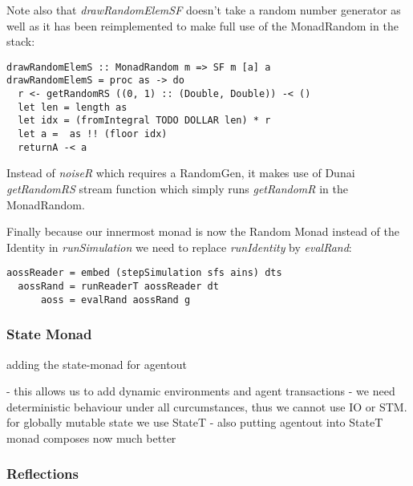 Note also that \textit{drawRandomElemSF} doesn't take a random number generator as well as it has been reimplemented to make full use of the MonadRandom in the stack:

\begin{verbatim}
drawRandomElemS :: MonadRandom m => SF m [a] a
drawRandomElemS = proc as -> do
  r <- getRandomRS ((0, 1) :: (Double, Double)) -< ()
  let len = length as
  let idx = (fromIntegral TODO DOLLAR len) * r
  let a =  as !! (floor idx)
  returnA -< a
\end{verbatim}

Instead of \textit{noiseR} which requires a RandomGen, it makes use of Dunai \textit{getRandomRS} stream function which simply runs \textit{getRandomR} in the MonadRandom.

Finally because our innermost monad is now the Random Monad instead of the Identity in \textit{runSimulation} we need to replace \textit{runIdentity} by \textit{evalRand}:

\begin{verbatim}
aossReader = embed (stepSimulation sfs ains) dts
  aossRand = runReaderT aossReader dt
      aoss = evalRand aossRand g
\end{verbatim}

\subsubsection{State Monad}
adding the state-monad for agentout

- this allows us to add dynamic environments and agent transactions
- we need deterministic behaviour under all curcumstances, thus we cannot use IO or STM. for globally mutable state we use StateT
- also putting agentout into StateT monad composes now much better

\subsubsection{Reflections}